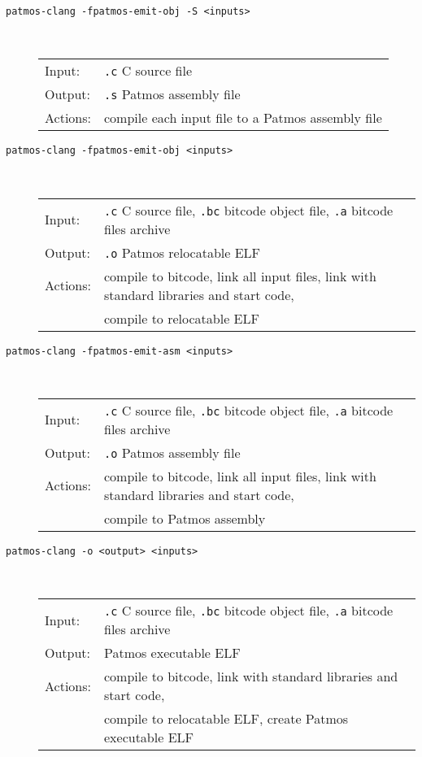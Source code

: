\begin{description}
\item[\texttt{patmos-clang -fpatmos-emit-obj -S <inputs>}] \hfill\\
  \begin{tabular}{ll}
  Input:   & \texttt{.c} C source file \\
  Output:  & \texttt{.s} Patmos assembly file \\
  Actions: & compile each input file to a Patmos assembly file
  \end{tabular}

\item[\texttt{patmos-clang -fpatmos-emit-obj <inputs>}] \hfill\\
  \begin{tabular}{ll}
  Input:   & \texttt{.c} C source file, \texttt{.bc} bitcode object file, \texttt{.a} bitcode files archive \\
  Output:  & \texttt{.o} Patmos relocatable ELF \\
  Actions: & compile to bitcode, link all input files, link with standard libraries and start code, \\
	   & compile to relocatable ELF
\end{tabular}

\item[\texttt{patmos-clang -fpatmos-emit-asm <inputs>}] \hfill\\
  \begin{tabular}{ll}
  Input:   & \texttt{.c} C source file, \texttt{.bc} bitcode object file, \texttt{.a} bitcode files archive \\
  Output:  & \texttt{.o} Patmos assembly file \\
  Actions: & compile to bitcode, link all input files, link with standard libraries and start code, \\
	   & compile to Patmos assembly
\end{tabular}

\item[\texttt{patmos-clang -o <output> <inputs>}] \hfill\\
  \begin{tabular}{ll}
  Input:   & \texttt{.c} C source file, \texttt{.bc} bitcode object file, \texttt{.a} bitcode files archive \\
  Output:  & Patmos executable ELF \\
  Actions: & compile to bitcode, link with standard libraries and start code, \\
           & compile to relocatable ELF, create Patmos executable ELF
  \end{tabular}

\end{description}

